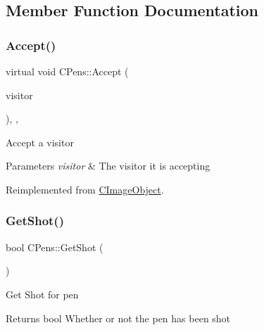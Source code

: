 \subsection{Member Function Documentation}
\mbox{\label{class_c_pens_a054fe093d31223c2ad66ab328e158f33}} 
\subsubsection{\texorpdfstring{Accept()}{Accept()}}
{\footnotesize\ttfamily virtual void C\+Pens\+::\+Accept (\begin{DoxyParamCaption}\item[{\mbox{\hyperlink{class_c_visitor}{C\+Visitor}} $\ast$}]{visitor }\end{DoxyParamCaption})\hspace{0.3cm}{\ttfamily [inline]}, {\ttfamily [override]}, {\ttfamily [virtual]}}

Accept a visitor 
\begin{DoxyParams}{Parameters}
{\em visitor} & The visitor it is accepting \\
\hline
\end{DoxyParams}


Reimplemented from \mbox{\hyperlink{class_c_image_object_a7130a9fa130c2028aba6c28dcfc876d5}{C\+Image\+Object}}.

\mbox{\label{class_c_pens_af87130ba45662455044dcc15547e9a57}} 
\subsubsection{\texorpdfstring{GetShot()}{GetShot()}}
{\footnotesize\ttfamily bool C\+Pens\+::\+Get\+Shot (\begin{DoxyParamCaption}{ }\end{DoxyParamCaption})\hspace{0.3cm}{\ttfamily [inline]}}

Get Shot for pen \begin{DoxyReturn}{Returns}
bool Whether or not the pen has been shot 
\end{DoxyReturn}
\mbox{\label{class_c_pens_a94df476295def576bc8274d2f0b25e87}} 
